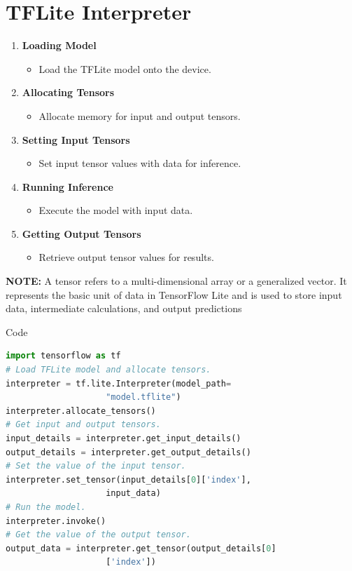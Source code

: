 \section{TFLite Interpreter}
{ 

\begin{enumerate}
	\item \textbf{Loading Model}
	\begin{itemize}
		\item Load the TFLite model onto the device.
	\end{itemize}
	
	\item \textbf{Allocating Tensors}
	\begin{itemize}
		\item Allocate memory for input and output tensors.
	\end{itemize}
	
	\item \textbf{Setting Input Tensors}
	\begin{itemize}
		\item Set input tensor values with data for inference.
	\end{itemize}
	
	\item \textbf{Running Inference}
	\begin{itemize}
		\item Execute the model with input data.
	\end{itemize}
	
	\item \textbf{Getting Output Tensors}
	\begin{itemize}
		\item Retrieve output tensor values for results.
	\end{itemize}
\end{enumerate}
\textbf{NOTE:} A tensor refers to a multi-dimensional array or a generalized vector. It represents the basic unit of data in TensorFlow Lite and is used to store input data, intermediate calculations, and output predictions
}

\begin{frame}[fragile]{Code}
	
	\begin{lstlisting}[language=Python]
import tensorflow as tf
# Load TFLite model and allocate tensors.
interpreter = tf.lite.Interpreter(model_path=
					"model.tflite")
interpreter.allocate_tensors()
# Get input and output tensors.
input_details = interpreter.get_input_details()
output_details = interpreter.get_output_details()
# Set the value of the input tensor.
interpreter.set_tensor(input_details[0]['index'], 
					input_data)
# Run the model.
interpreter.invoke()
# Get the value of the output tensor.
output_data = interpreter.get_tensor(output_details[0]
					['index'])
	\end{lstlisting}
	
\end{frame}

